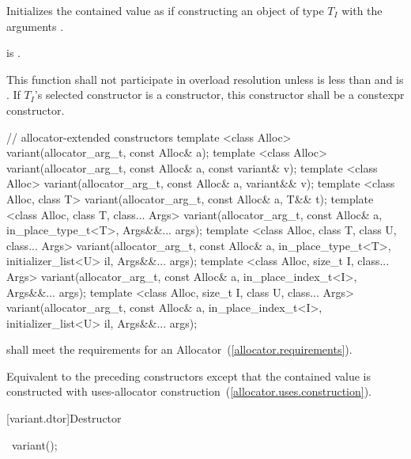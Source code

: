 \begin{itemdescr}
\pnum
\effects
Initializes the contained value as if constructing an object of type
$T_I$ with the arguments .

\pnum
\postconditions
{} is .

\pnum
\remarks
This function shall not participate in overload resolution unless  is
less than  and
 is .
If $T_I$'s selected constructor is a  constructor, this
constructor shall be a constexpr constructor.
\end{itemdescr}

%
\begin{itemdecl}
// allocator-extended constructors
template <class Alloc>
  variant(allocator_arg_t, const Alloc& a);
template <class Alloc>
  variant(allocator_arg_t, const Alloc& a, const variant& v);
template <class Alloc>
  variant(allocator_arg_t, const Alloc& a, variant&& v);
template <class Alloc, class T>
  variant(allocator_arg_t, const Alloc& a, T&& t);
template <class Alloc, class T, class... Args>
  variant(allocator_arg_t, const Alloc& a, in_place_type_t<T>, Args&&... args);
template <class Alloc, class T, class U, class... Args>
  variant(allocator_arg_t, const Alloc& a, in_place_type_t<T>,
          initializer_list<U> il, Args&&... args);
template <class Alloc, size_t I, class... Args>
  variant(allocator_arg_t, const Alloc& a, in_place_index_t<I>, Args&&... args);
template <class Alloc, size_t I, class U, class... Args>
  variant(allocator_arg_t, const Alloc& a, in_place_index_t<I>,
          initializer_list<U> il, Args&&... args);
\end{itemdecl}

\begin{itemdescr}
\pnum
\requires
{} shall meet the requirements for an Allocator~(\ref{allocator.requirements}).

\pnum
\effects
Equivalent to the preceding constructors except that the contained value is
constructed with uses-allocator construction~(\ref{allocator.uses.construction}).
\end{itemdescr}

[variant.dtor]{Destructor}

%
\begin{itemdecl}
~variant();
\end{itemdecl}

